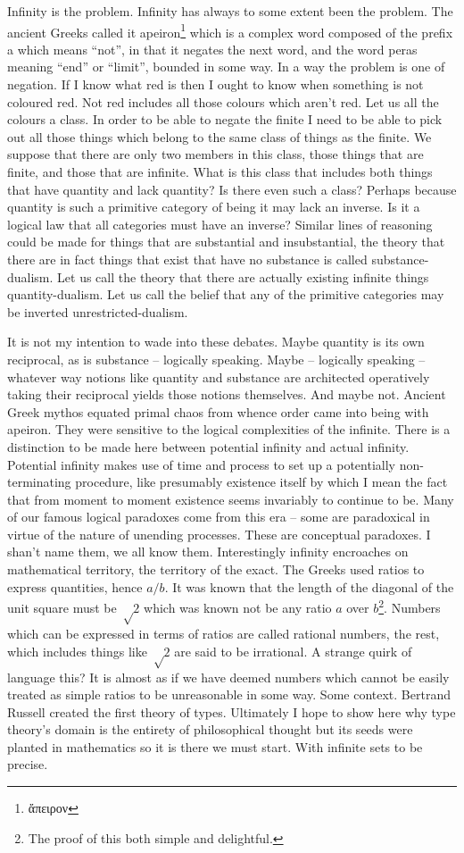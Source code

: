 \documentclass[dah,phd,a4paper]{xe_uccthesis}
\begin{document}
Infinity is the problem. Infinity has always to some extent been the problem. The ancient Greeks called it apeiron\footnote{ἄπειρον} which is a complex word composed of the prefix a which means “not”, in that it negates the next word, and the word peras meaning “end” or “limit”,  bounded in some way. In a way the problem is one of negation. If I know what red is then I ought to know when something is not coloured red. Not red includes all those colours which aren't red. Let us all the colours a class. In order to be able to negate the finite I need to be able to pick out all those things which belong to the same class of things as the finite. We suppose that there are only two members in this class, those things that are finite, and those that are infinite. What is this class that includes both things that have quantity and lack quantity? Is there even such a class? Perhaps because quantity is such a primitive category of being it may lack an inverse. Is it a logical law that all categories must have an inverse? Similar lines of reasoning could be made for things that are substantial and insubstantial, the theory that there are in fact things that exist that have no substance is called substance-dualism. Let us call the theory that there are actually existing infinite things quantity-dualism. Let us call the belief that any of the primitive categories may be inverted unrestricted-dualism.

It is not my intention to wade into these debates. Maybe quantity is its own reciprocal, as is substance – logically speaking. Maybe – logically speaking – whatever way notions like quantity and substance are architected operatively taking their reciprocal yields those notions themselves. And maybe not.
	Ancient Greek mythos equated primal chaos from whence order came into being with apeiron. They were sensitive to the logical complexities of the infinite. There is a distinction to be made here between potential infinity and actual infinity. Potential infinity makes use of time and process to set up a potentially non-terminating procedure, like presumably existence itself by which I mean the fact that from moment to moment existence seems invariably to continue to be.
	Many of our famous logical paradoxes come from this era – some are paradoxical in virtue of the nature of unending processes. These are conceptual paradoxes. I shan't name them, we all know them. Interestingly infinity encroaches on mathematical territory, the territory of the exact. The Greeks used ratios to express quantities, hence $a/b$. It was known that the length of the diagonal of the unit square must be $√2$ which was known not be any ratio $a$ over $b$\footnote{The proof of this both simple and delightful.}. Numbers which can be expressed in terms of ratios are called rational numbers, the rest, which includes things like $√2$ are said to be irrational. A strange quirk of language this? It is almost as if we have deemed numbers which cannot be easily treated as simple ratios to be unreasonable in some way.
	Some context. Bertrand Russell created the first theory of types. Ultimately I hope to show here why type theory's domain is the entirety of philosophical thought but its seeds were planted in mathematics so it is there we must start. With infinite sets to be precise.
	
\end{document}
